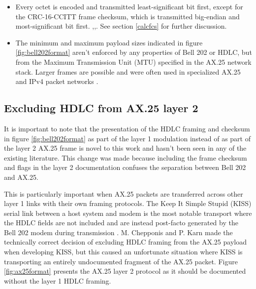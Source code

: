 \documentclass[12pt,letterpaper]{article}
\begin{document}
\begin{itemize}
		This is done by ``bit-stuffing" the transmitted bitstream by
		appending a zero after any string of five ones at the transmitter,
		and subsequently dropping this zero following five ones at the 
		receiver.\footnote{Six ones in a row represent a 0x7E flag indicating 
			the end of a frame or an idle carrier.
			Seven or more ones in a row indicate an invalid channel state
			that shouldn't happen, but regularly does, so modems must be 
			able to handle arbitrary strings of ones gracefully.}
	\item Every octet is encoded and transmitted least-significant bit first,
		except for the CRC-16-CCITT frame checksum, 
		which is transmitted big-endian
		and most-significant bit first.
		\cite{n1vgphy},\cite[\S8.1.1-2]{ituv42},\cite[\S3.8]{ax25spec}.
		See section \ref{calcfcs} for further discussion.
	\item The minimum and maximum payload sizes indicated in figure 
		\ref{fig:bell202format} aren't enforced by any properties of 
		Bell 202 or HDLC, but from the Maximum Transmission Unit (MTU)
		specified in the AX.25 network stack.
		Larger frames are possible and were often used in specialized 
		AX.25 and IPv4 packet networks \cite{pattersoninterview}.

\end{itemize}

\subsection{Excluding HDLC from AX.25 layer 2}

It is important to note that the presentation of the HDLC framing
and checksum
in figure \ref{fig:bell202format} as part of the layer 1 modulation 
instead of as part of the layer 2 AX.25 frame is 
novel to this work and hasn't been seen in any of the existing literature.
This change was made because including the frame checksum and flags
in the layer 2 documentation confuses the separation between Bell 202 
and AX.25. 

This is particularly important when AX.25 packets are transferred across 
other layer 1 links with their own framing protocols.
The Keep It Simple Stupid (KISS) serial link between 
a host system and modem is the most notable
transport where the HDLC fields are not included and are instead 
post-facto generated by the Bell 202 modem during transmission \cite{KISSspec}.
M. Chepponis and P. Karn made the technically correct decision of excluding 
HDLC framing from the AX.25 payload when developing KISS, but this caused
an unfortunate situation where KISS is transporting an entirely
undocumented fragment of the AX.25 packet. Figure \ref{fig:ax25format} 
presents the AX.25 layer 2 protocol as it should be documented without
the layer 1 HDLC framing.
\end{document}
